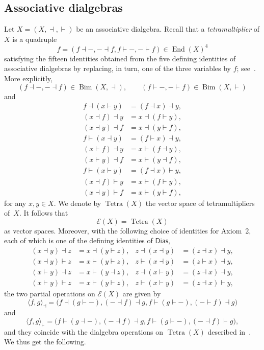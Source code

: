 \documentclass[reqno,a4paper]{amsart}
\theoremstyle{plain}
\theoremstyle{definition}
\theoremstyle{remark}
\numberwithin{equation}{section}
\newcommand{\E}{\mathcal{E}}
\DeclareMathOperator{\Bim}{Bim}
\DeclareMathOperator{\End}{End}
\newcommand{\Dias}{\ensuremath{\mathsf{Dias}}}
\newcommand{\Tetra}{\operatorname{Tetra}}
\begin{document}
\subsection{Associative dialgebras}\label{SecExternalDias}

Let $X=(X,\dashv,\vdash)$ be an associative dialgebra. Recall that a \emph{tetramultiplier} of $X$ is a quadruple
\[
f=(f\dashv-,-\dashv f,f\vdash-,-\vdash f)\in\End(X)^4
\]
satisfying the fifteen identities obtained from the five defining identities of associative dialgebras by replacing, in turn, one of the three variables by $f$; see~\cite[Definition~2.4]{CasasEtAlTetra}. More explicitly,
\[
(f\dashv-,-\dashv f)\in\Bim(X,\dashv),
\qquad
(f\vdash-,-\vdash f)\in\Bim(X,\vdash)
\]
and
\begin{align*}
f\dashv(x\vdash y)&=(f\dashv x)\dashv y,\\
(x\dashv f)\dashv y&=x\dashv(f\vdash y),\\
(x\dashv y)\dashv f&=x\dashv(y\vdash f),\\
f\vdash(x\dashv y)&=(f\vdash x)\dashv y,\\
(x\vdash f)\dashv y&=x\vdash(f\dashv y),\\
(x\vdash y)\dashv f&=x\vdash(y\dashv f),\\
f\vdash(x\vdash y)&=(f\dashv x)\vdash y,\\
(x\dashv f)\vdash y&=x\vdash(f\vdash y),\\
(x\dashv y)\vdash f&=x\vdash(y\vdash f),
\end{align*}
for any $x,y \in X$. We denote by $\Tetra(X)$ the vector space of tetramultipliers of~$X$. It follows that
\[
\E(X)=\Tetra(X)
\]
as vector spaces. Moreover, with the following choice of identities for Axiom~2, each of which is one of the defining identities of $\Dias$,
\begin{align*}
(x\dashv y)\dashv z&=x\dashv(y\vdash z), &
z\dashv(x\dashv y)&=(z\dashv x)\dashv y,\\
(x\dashv y)\vdash z&=x\vdash(y\vdash z), &
z\vdash(x\dashv y)&=(z\vdash x)\dashv y,\\
(x\vdash y)\dashv z&=x\vdash(y\dashv z), &
z\dashv(x\vdash y)&=(z\dashv x)\dashv y,\\
(x\vdash y)\vdash z&=x\vdash(y\vdash z), &
z\vdash(x\vdash y)&=(z\dashv x)\vdash y,
\end{align*}
the two partial operations on $\E(X)$ are given by
\[
\langle f,g\rangle_{\dashv}
=
\bigl(
f\dashv(g\vdash-),
(-\dashv f)\dashv g,
f\vdash(g\vdash-),
(-\vdash f)\dashv g
\bigr)
\]
and
\[
\langle f,g\rangle_{\vdash}
=
\bigl(
f\vdash(g\dashv-),
(-\dashv f)\dashv g,
f\vdash(g\vdash-),
(-\dashv f)\vdash g
\bigr),
\]
and they coincide with the dialgebra operations on $\Tetra(X)$ described in~\cite{CasasEtAlTetra}. We thus get the following.
\end{document}

